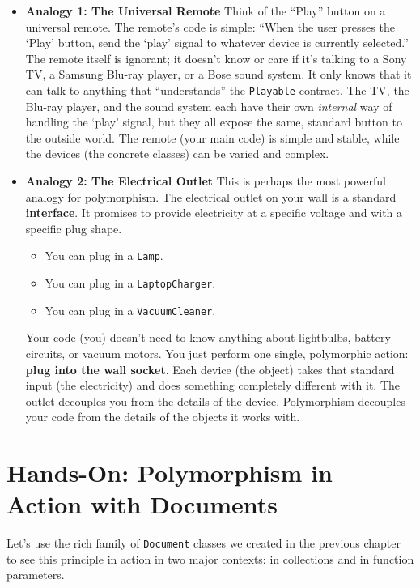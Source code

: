 \documentclass[
  letterpaper,
  DIV=11,
  numbers=noendperiod]{scrreprt}
\providecommand{\tightlist}{%
  \setlength{\itemsep}{0pt}\setlength{\parskip}{0pt}}
\begin{document}
\begin{itemize}
\item
  \textbf{Analogy 1: The Universal Remote} Think of the ``Play'' button
  on a universal remote. The remote's code is simple: ``When the user
  presses the `Play' button, send the `play' signal to whatever device
  is currently selected.'' The remote itself is ignorant; it doesn't
  know or care if it's talking to a Sony TV, a Samsung Blu-ray player,
  or a Bose sound system. It only knows that it can talk to anything
  that ``understands'' the \texttt{Playable} contract. The TV, the
  Blu-ray player, and the sound system each have their own
  \emph{internal} way of handling the `play' signal, but they all expose
  the same, standard button to the outside world. The remote (your main
  code) is simple and stable, while the devices (the concrete classes)
  can be varied and complex.
\item
  \textbf{Analogy 2: The Electrical Outlet} This is perhaps the most
  powerful analogy for polymorphism. The electrical outlet on your wall
  is a standard \textbf{interface}. It promises to provide electricity
  at a specific voltage and with a specific plug shape.

  \begin{itemize}
  \tightlist
  \item
    You can plug in a \texttt{Lamp}.
  \item
    You can plug in a \texttt{LaptopCharger}.
  \item
    You can plug in a \texttt{VacuumCleaner}.
  \end{itemize}

  Your code (you) doesn't need to know anything about lightbulbs,
  battery circuits, or vacuum motors. You just perform one single,
  polymorphic action: \textbf{plug into the wall socket}. Each device
  (the object) takes that standard input (the electricity) and does
  something completely different with it. The outlet decouples you from
  the details of the device. Polymorphism decouples your code from the
  details of the objects it works with.
\end{itemize}

\section{Hands-On: Polymorphism in Action with
Documents}\label{hands-on-polymorphism-in-action-with-documents}

Let's use the rich family of \texttt{Document} classes we created in the
previous chapter to see this principle in action in two major contexts:
in collections and in function parameters.
\end{document}
